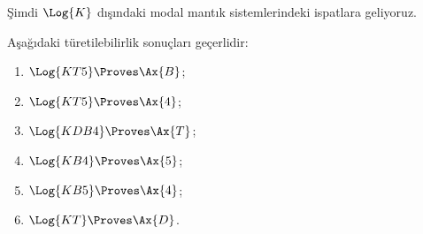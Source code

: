 \documentclass[../../../include/open-logic-section]{subfiles}
\begin{document}


Şimdi $\Log{K}$ dışındaki modal mantık sistemlerindeki ispatlara geliyoruz.

\begin{prop}
Aşağıdaki türetilebilirlik sonuçları geçerlidir:
  \begin{enumerate}
  \item $\Log{KT5} \Proves \Ax{B}$;
  \item $\Log{KT5} \Proves \Ax{4}$;
  \item $\Log{KDB4} \Proves \Ax{T}$;
  \item $\Log{KB4} \Proves \Ax{5}$;
  \item $\Log{KB5} \Proves \Ax{4}$;
  \item {}$\Log{KT} \Proves \Ax{D}$.
  \end{enumerate}
\end{prop}
\end{document}
